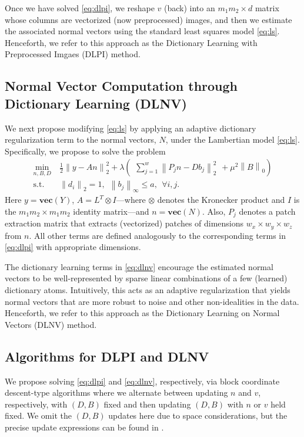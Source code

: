 Once we have solved \eqref{eq:dlpi}, we reshape $v$ (back) into an $m_1 m_2 \times d$ matrix whose columns are vectorized (now preprocessed) images, and then we estimate the associated normal vectors using the standard least squares model \eqref{eq:ls}. Henceforth, we refer to this approach as the Dictionary Learning with Preprocessed Imgaes (DLPI) method.

\subsection{Normal Vector Computation through Dictionary Learning (DLNV)}
We next propose modifying \eqref{eq:ls} by applying an adaptive dictionary regularization term to the normal vectors, $N$, under the Lambertian model \eqref{eq:ls}. Specifically, we propose to solve the problem
\begin{align} \label{eq:dlnv}
\min_{n,B,D} & ~ \frac{1}{2} \left \| y - A n \right \|_2^2 + \lambda \left ( \begin{matrix} \sum_{j=1}^w \left \| P_j n - D b_j \right \|_2^2 \end{matrix} + \mu^2 \left \| B \right \|_0 \right ) \nonumber \\
\text{s.t.} & ~ \left \| d_i \right \|_2 = 1, \ \ \left \| b_j \right \|_{\infty} \leq a, ~~ \forall i,j.
\end{align}
Here $y = \textbf{vec}(Y)$, $A = L^T \otimes I$---where $\otimes$ denotes the Kronecker product and $I$ is the $m_1 m_2 \times m_1 m_2$ identity matrix---and $n = \textbf{vec}(N)$. Also, $P_j$ denotes a patch extraction matrix that extracts (vectorized) patches of dimensions $w_x \times w_y \times w_z$ from $n$. All other terms are defined analogously to the corresponding terms in \eqref{eq:dlpi} with appropriate dimensions. 

The dictionary learning terms in \eqref{eq:dlnv} encourage the estimated normal vectors to be well-represented by sparse linear combinations of a few (learned) dictionary atoms. Intuitively,  this acts as an adaptive regularization that yields normal vectors that are more robust to noise and other non-idealities in the data.
Henceforth, we refer to this approach as the Dictionary Learning on Normal Vectors (DLNV) method.






\subsection{Algorithms for DLPI and DLNV} \label{sec:dl_sol}
We propose solving \eqref{eq:dlpi} and \eqref{eq:dlnv}, respectively, via block coordinate descent-type algorithms where we alternate between updating $n$ and $v$, respectively, with $(D,B)$ fixed and then updating $(D,B)$ with $n$ or $v$ held fixed. We omit the $(D,B)$ updates here due to space considerations, but the precise update expressions can be found in \cite{sairajfes2,dinokat2016}. 

